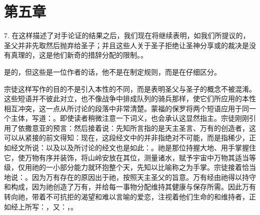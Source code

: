 
\section{第五章}

\par

7. 在这样描述了对手论证的结果之后，我们现在将继续表明，如我们所提议的，圣父并非先取然后抛弃给圣子；并且这些人关于圣子拒绝让圣神分享或的裁决是没有真理的，这是他们新奇的措辞分配的限制。。\par

是的，但这些是一位作者的话，他不是在制定规则，而是在仔细区分。\par

宗徒这样写作的目的不是引入本性的不同，而是表明圣父与圣子的概念不被混淆。这些短语并不彼此对立，也不像战争中排成队列的骑兵那样，使它们所应用的本性相互冲突，这一点从所讨论的段落中非常清楚。蒙福的保罗将两个短语应用于同一个主体，写道：。即使读者稍微注意一下词义，也会承认这显然指主。宗徒刚刚引用了依撒意亚的预言：然后接着说：先知所言指的是天主圣言、万有的创造者，这可以从紧接的前文得知：现在，这段经文中的并非指绝对不可能，而是指稀少，正如经文所说：以及以及所讨论的经文也是如此：。祂是那位持握大地、用手掌握住它，使万物有序并装饰，将山岭安放在其位，测量诸水，赋予宇宙中万物其适当等级，仅用祂的一小部分能力就环抱整个天，先知以比喻称之为手掌。宗徒接着恰当地说：。因为万有存在的原因出于祂，按照天主圣父的旨意。万有经由祂得以持守和构成，因为祂创造了万有，并给每一事物分配维持其健康与保存所需。因此万有转向祂，带着不可抗拒的渴望和难以言喻的爱恋，注视着他们生命的和维持者，正如经上所写：，又：，。\par

